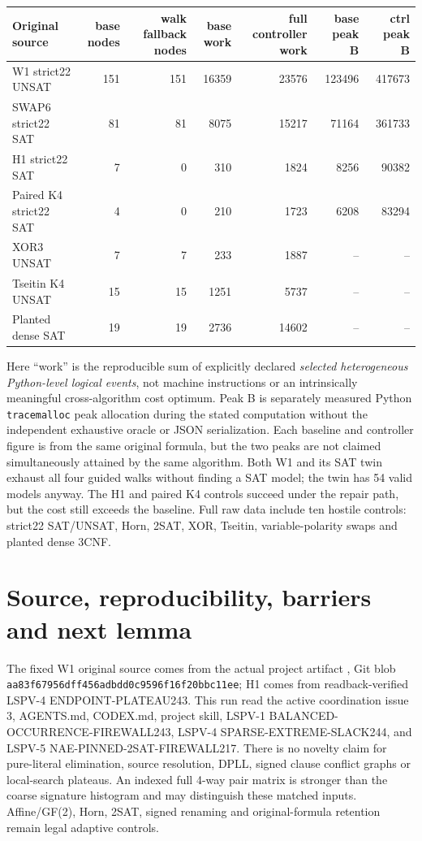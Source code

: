 \documentclass[10pt]{article}
\begin{document}
\begin{center}\small
\begin{tabular}{lrrrrrr}
\toprule
Original source & base nodes & walk fallback nodes & base work & full controller work & base peak B & ctrl peak B\\\midrule
W1 strict22 UNSAT &151&151&16359&23576&123496&417673\\
SWAP6 strict22 SAT &81&81&8075&15217&71164&361733\\
H1 strict22 SAT &7&0&310&1824&8256&90382\\
Paired K4 strict22 SAT &4&0&210&1723&6208&83294\\
XOR3 UNSAT &7&7&233&1887&--&--\\
Tseitin K4 UNSAT &15&15&1251&5737&--&--\\
Planted dense SAT &19&19&2736&14602&--&--\\
\bottomrule
\end{tabular}\end{center}
Here ``work'' is the reproducible sum of explicitly declared \emph{selected heterogeneous Python-level logical events}, not machine instructions or an intrinsically meaningful cross-algorithm cost optimum. Peak B is separately measured Python \texttt{tracemalloc} peak allocation during the stated computation without the independent exhaustive oracle or JSON serialization. Each baseline and controller figure is from the same original formula, but the two peaks are not claimed simultaneously attained by the same algorithm. Both W1 and its SAT twin exhaust all four guided walks without finding a SAT model; the twin has 54 valid models anyway. The H1 and paired K4 controls succeed under the repair path, but the cost still exceeds the baseline. Full raw data include ten hostile controls: strict22 SAT/UNSAT, Horn, 2SAT, XOR, Tseitin, variable-polarity swaps and planted dense 3CNF.

\section*{Source, reproducibility, barriers and next lemma}
The fixed W1 original source comes from the actual project artifact , Git blob \texttt{aa83f67956dff456adbdd0c9596f16f20bbc11ee}; H1 comes from readback-verified LSPV-4 ENDPOINT-PLATEAU243. This run read the active coordination issue 3, AGENTS.md, CODEX.md, project skill, LSPV-1 BALANCED-OCCURRENCE-FIREWALL243, LSPV-4 SPARSE-EXTREME-SLACK244, and LSPV-5 NAE-PINNED-2SAT-FIREWALL217. There is no novelty claim for pure-literal elimination, source resolution, DPLL, signed clause conflict graphs or local-search plateaus. An indexed full 4-way pair matrix is stronger than the coarse signature histogram and may distinguish these matched inputs. Affine/GF(2), Horn, 2SAT, signed renaming and original-formula retention remain legal adaptive controls.
\end{document}
